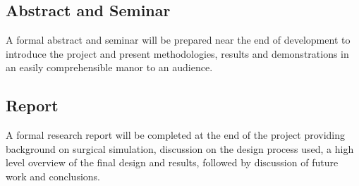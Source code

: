 \subsection{Abstract and Seminar}

A formal abstract and seminar will be prepared near the end of development to introduce the project and present methodologies, results and demonstrations in an easily comprehensible manor to an audience.

\subsection{Report}

A formal research report will be completed at the end of the project providing background on surgical simulation, discussion on the design process used, a high level overview of the final design and results, followed by discussion of future work and conclusions. 







